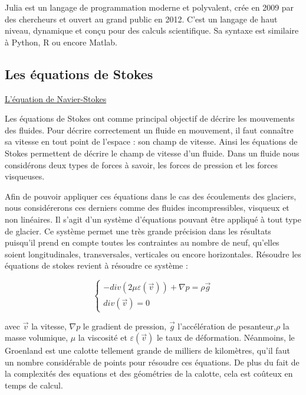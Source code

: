\documentclass{article}
\begin{document}
Julia est un langage de programmation moderne et polyvalent, crée en 2009 par des chercheurs et ouvert au grand public en 2012. C'est un langage de haut niveau, dynamique et conçu pour des calculs scientifique. Sa syntaxe est similaire à Python, R ou encore Matlab.
 


\subsection{Les équations de Stokes}

\href{https://scienceetonnante.com/2014/03/03/la-mysterieuse-equation-de-navier-stokes/}{L'équation de Navier-Stokes}

Les équations de Stokes ont comme principal objectif de décrire les mouvements des fluides. 
Pour décrire correctement un fluide en mouvement, il faut connaître sa vitesse en tout point de l'espace : son champ de vitesse. Ainsi les équations de Stokes permettent de décrire le champ de vitesse d'un fluide. 
Dans un fluide nous considérons deux types de forces à savoir, les forces de pression et les forces visqueuses. 

Afin de pouvoir appliquer ces équations dans le cas des écoulements des glaciers, nous considérerons ces derniers comme des fluides incompressibles, visqueux et non linéaires. Il s'agit d'un système d'équations pouvant être appliqué à tout type de glacier.
\newpage
Ce système permet une très grande précision dans les résultats puisqu'il prend en compte toutes les contraintes au nombre de neuf, qu’elles soient longitudinales, transversales, verticales ou encore horizontales. 
Résoudre les équations de stokes revient à résoudre ce système : 


\begin{equation}
\left\{
\begin{array}{l}
-div(2 \mu \varepsilon(\vec{v})) + \nabla p = \rho \vec{g} \\
div(\vec{v}) = 0 \qquad
\end{array}
\right.
\label{eq1}
\end{equation}

avec $\vec{v}$ la vitesse, $\nabla p$ le gradient de pression, $\vec{g}$ l'accélération de pesanteur,$\rho$ la masse volumique, $\mu$ la viscosité et $\varepsilon(\vec{v})$ le taux de déformation.
Néanmoins, le Groenland est une calotte tellement grande de milliers de kilomètres, qu'il faut un nombre considérable de points pour résoudre ces équations. De plus du fait de la complexités des equations et des géométries de la calotte, cela est coûteux en temps de calcul. 
\end{document}
